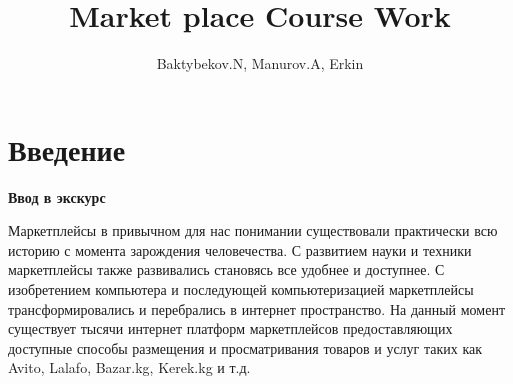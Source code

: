 
\title{Market place Course Work}

\author{Baktybekov.N, Manurov.A, Erkin}



\maketitle

\newpage
\tableofcontents{}
\setcounter{page}{1}

\newpage
{}

     
     
     
     
     
     

\section*{Введение}

\textbf{Ввод в экскурс}


Маркетплейсы в привычном для нас понимании существовали практически всю историю с момента зарождения человечества. С развитием науки и техники маркетплейсы также развивались становясь все удобнее и доступнее.
С изобретением компьютера и последующей компьютеризацией маркетплейсы трансформировались и перебрались в интернет пространство.
На данный момент существует тысячи интернет платформ маркетплейсов предоставляющих доступные способы размещения и просматривания товаров и услуг таких как Avito, Lalafo, Bazar.kg, Kerek.kg  и т.д. 

